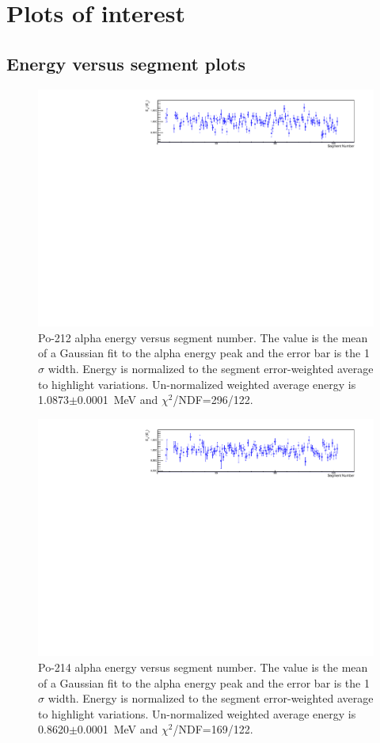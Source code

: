 \section{Plots of interest}
\subsection{Energy versus segment plots}
\begin{figure}[!h]
\centering
\includegraphics[width=1.05\textwidth]{figures/PubBiPo212EvsCell.pdf}
\caption{\label{fig:EvsCell212}Po-212 alpha energy versus segment number. The value is the mean of a Gaussian fit to the alpha energy peak and the error bar is the 1$\sigma$ width. Energy is normalized to the segment error-weighted average to highlight variations. Un-normalized weighted average energy is 1.0873$\pm$0.0001~MeV and $\chi^2$/NDF=296/122.}
\end{figure}
\begin{figure}[!h]
\centering
\includegraphics[width=1.05\textwidth]{figures/PubBiPo214EvsCell.pdf}
\caption{\label{fig:EvsCell214}Po-214 alpha energy versus segment number. The value is the mean of a Gaussian fit to the alpha energy peak and the error bar is the 1$\sigma$ width. Energy is normalized to the segment error-weighted average to highlight variations. Un-normalized weighted average energy is 0.8620$\pm$0.0001~MeV and $\chi^2$/NDF=169/122.} 
\end{figure}
\newpage
